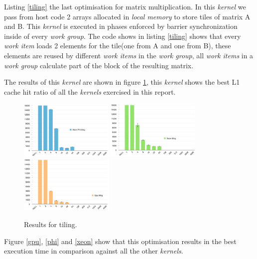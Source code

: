 \par{Listing \ref{tiling} the last optimisation for matrix multiplication. In
    this \emph{kernel} we pass from host code 2 arrays allocated in \emph{local
    memory} to store tiles of matrix A and B. This \emph{kernel} is executed in
    phases enforced by barrier synchronization inside of every \emph{work group}.
    The code shows in listing \ref{tiling} shows that every \emph{work item} loads
    2 elements for the tile(one from A and one from B), these elements are reused 
    by different \emph{work items} in the \emph{work group}, all \emph{work items
    } in a \emph{work group} calculate part of the block of the resulting matrix.}

\par{The results of this \emph{kernel} are shown in figure \ref{tilingResults},
    this \emph{kernel} shows the best L1 cache hit ratio of all the \emph{
        kernels} exercised in this report.}

\begin{figure}[!h]
    \centering
    \includegraphics[width=0.4\textwidth]{figures/phiTiling.png}
    \includegraphics[width=0.4\textwidth]{figures/xeonTiling.png}
    \includegraphics[width=0.4\textwidth]{figures/gpuTiling.png}
    \caption{Results for tiling.}
    \label{tilingResults}
\end{figure}

\par{Figure \ref{gpu}, \ref{phi} and \ref{xeon} show that this optimisation 
    results in the best execution time in comparison against all the other
    \emph{kernels}.}


